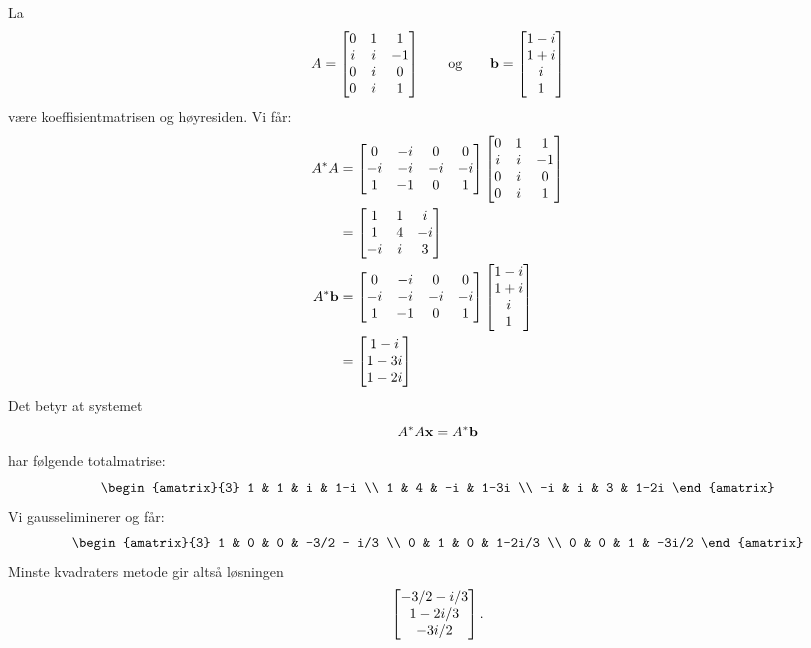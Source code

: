 \begin{losning}
\begin{punkt}
La
\[
A =
\begin{bmatrix}
0 & 1 &  1 \\
i & i & -1 \\
0 & i &  0 \\
0 & i &  1
\end{bmatrix}
\qquad\text{og}\qquad
\mathbf{b} = \begin{bmatrix} 1-i \\ 1+i \\ i \\ 1 \end{bmatrix}
\]
være koeffisientmatrisen og høyresiden.  Vi får:
\begin{align*}
A^* A &=
\begin{bmatrix}
 0 & -i &  0 &  0 \\
-i & -i & -i & -i \\
 1 & -1 &  0 &  1
\end{bmatrix}
\begin{bmatrix}
0 & 1 &  1 \\
i & i & -1 \\
0 & i &  0 \\
0 & i &  1
\end{bmatrix}
\\
&=
\begin{bmatrix}
 1 & 1 &  i \\
 1 & 4 & -i \\
-i & i &  3
\end{bmatrix}
\\
A^* \mathbf{b} &=
\begin{bmatrix}
 0 & -i &  0 &  0 \\
-i & -i & -i & -i \\
 1 & -1 &  0 &  1
\end{bmatrix}
\begin{bmatrix} 1-i \\ 1+i \\ i \\ 1 \end{bmatrix}
\\
&=
\begin{bmatrix} 1-i \\ 1-3i \\ 1-2i \end{bmatrix}
\end{align*}
Det betyr at systemet
\[
A^* A \mathbf{x} = A^* \mathbf{b}
\]
har følgende totalmatrise:
\[
\begin{amatrix}{3}
 1 & 1 &  i & 1-i  \\
 1 & 4 & -i & 1-3i \\
-i & i &  3 & 1-2i
\end{amatrix}
\]
Vi gausseliminerer og får:
\[
\begin{amatrix}{3}
1 & 0 & 0 & -3/2 - i/3 \\
0 & 1 & 0 & 1-2i/3 \\
0 & 0 & 1 & -3i/2
\end{amatrix}
\]
Minste kvadraters metode gir altså løsningen
\[
\begin{bmatrix} -3/2 - i/3 \\ 1-2i/3 \\ -3i/2 \end{bmatrix}.
\]
\end{punkt}
\end{losning}



